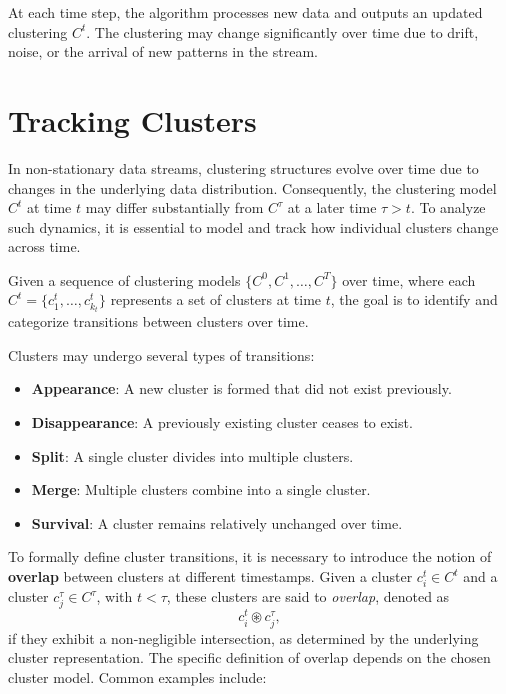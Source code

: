 At each time step, the algorithm processes new data and outputs an updated
clustering $C^t$. The clustering may change significantly over time due to
drift, noise, or the arrival of new patterns in the stream.

\section{Tracking Clusters}\label{sec:prob_tracking_clusters}
In non-stationary data streams, clustering structures evolve over time due to
changes in the underlying data distribution. Consequently, the clustering model
$C^t$ at time $t$ may differ substantially from $C^\tau$ at a later time $\tau
    > t$. To analyze such dynamics, it is essential to model and track how
individual clusters change across time.

Given a sequence of clustering models $\{C^0, C^1, \dots, C^T\}$ over time,
where each $C^t = \{c_1^t, \dots, c_{k_t}^t\}$ represents a set of clusters at
time $t$, the goal is to identify and categorize transitions between clusters
over time.

Clusters may undergo several types of transitions:

\begin{itemize}
    \item \textbf{Appearance}: A new cluster is formed that did not exist previously.
    \item \textbf{Disappearance}: A previously existing cluster ceases to exist.
    \item \textbf{Split}: A single cluster divides into multiple clusters.
    \item \textbf{Merge}: Multiple clusters combine into a single cluster.
    \item \textbf{Survival}: A cluster remains relatively unchanged over time.
\end{itemize}

To formally define cluster transitions, it is necessary to introduce the notion
of \textbf{overlap} between clusters at different timestamps. Given a cluster $
    c_i^t \in C^t $ and a cluster $ c_j^\tau \in C^\tau $, with $ t < \tau $, these
clusters are said to \emph{overlap}, denoted as
\begin{equation}
    c_i^t \circledast c_j^\tau,
\end{equation}
if they exhibit a non-negligible intersection, as determined by the underlying
cluster representation. The specific definition of overlap depends on the chosen
cluster model. Common examples include:

